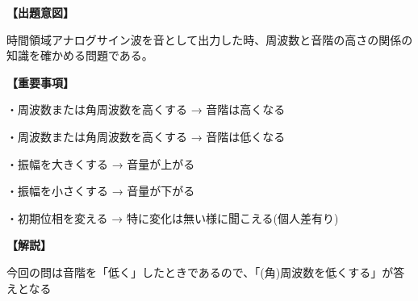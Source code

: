 \noindent \textbf{【出題意図】}

\noindent 時間領域アナログサイン波を音として出力した時、周波数と音階の高さの関係の知識を確かめる問題である。

\vspace{1em}
\noindent \textbf{【重要事項】}

\medskip
\noindent ・周波数または角周波数を高くする → 音階は高くなる

\medskip
\noindent ・周波数または角周波数を高くする → 音階は低くなる

\medskip
\noindent ・振幅を大きくする → 音量が上がる

\medskip
\noindent ・振幅を小さくする → 音量が下がる

\medskip
\noindent ・初期位相を変える → 特に変化は無い様に聞こえる(個人差有り)

\vspace{1em}
\noindent \textbf{【解説】}

\noindent 今回の問は音階を「低く」したときであるので、「(角)周波数を低くする」が答えとなる

